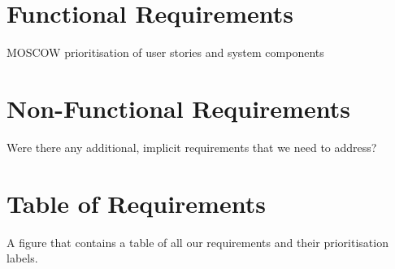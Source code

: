 \documentclass{l4proj}
\begin{document}
\section{Functional Requirements}
MOSCOW prioritisation of user stories and system components

\section{Non-Functional Requirements}
Were there any additional, implicit requirements that we need to address? 

\section{Table of Requirements}
A figure that contains a table of all our requirements and their prioritisation labels. 
\end{document}
